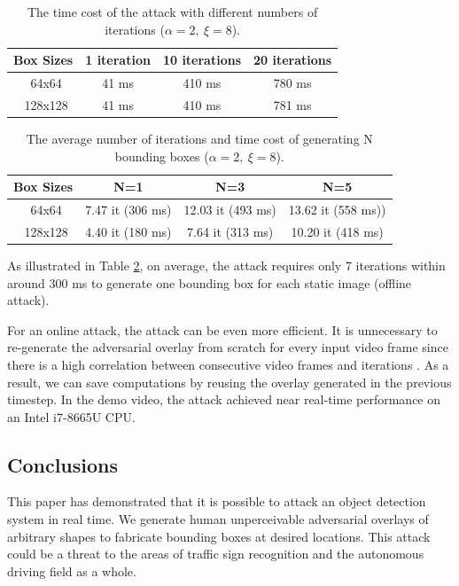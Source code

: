 \begin{table}[H]
    \centering
    \begin{tabular}{cccc}
    \hline
    Box Sizes & 1 iteration & 10 iterations & 20 iterations\\
    \hline
    \ 64x64    & 41 ms  & 410 ms & 780 ms \\
    \ 128x128  & 41 ms  & 410 ms & 781 ms \\
    \hline
    \end{tabular}
    \caption{The time cost of the attack with different numbers of iterations ($\alpha=2,\ \xi=8$).}
    \label{tab:fix-it}
\end{table}

\begin{table}[H]
    \centering
    \begin{tabular}{cccc}
    \hline
    Box Sizes & N=1 & N=3 & N=5\\
    \hline
    \ 64x64    & 7.47 it (306 ms)  & 12.03 it (493 ms) &  13.62 it (558 ms)) \\
    \ 128x128  & 4.40 it (180 ms)  & 7.64 it (313 ms) & 10.20 it (418 ms) \\
    \hline
    \end{tabular}
    \caption{The average number of iterations and time cost of generating N bounding boxes ($\alpha=2,\ \xi=8$).}
    \label{tab:fix-box}
\end{table}

As illustrated in Table \ref{tab:fix-box}, on average, the attack requires only 7 iterations within around 300 ms to generate one bounding box for each static image (offline attack). 

For an online attack, the attack can be even more efficient. It is unnecessary to re-generate the adversarial overlay from scratch for every input video frame since there is a high correlation between consecutive video frames and iterations \citep{ilyas2018prior}. As a result, we can save computations by reusing the overlay generated in the previous timestep. In the demo video, the attack achieved near real-time performance on an Intel i7-8665U CPU.

\subsection{Conclusions}

This paper has demonstrated that it is possible to attack an object detection system in real time. We generate human unperceivable adversarial overlays of arbitrary shapes to fabricate bounding boxes at desired locations. This attack could be a threat to the areas of traffic sign recognition and the autonomous driving field as a whole.

